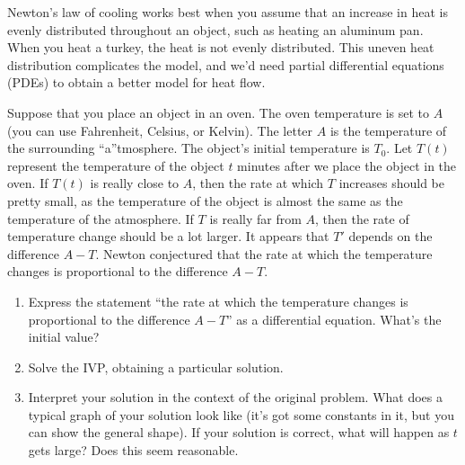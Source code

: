 Newton's law of cooling works best when you assume that an increase in heat is evenly distributed throughout an object, such as heating an aluminum pan. When you heat a turkey, the heat is not evenly distributed. 
This uneven heat distribution complicates the model, and we'd need partial differential equations (PDEs) to obtain a better model for heat flow.  

 
\begin{problem}
 Suppose that you place an object in an oven.  The oven temperature is set to $A$ (you can use Fahrenheit, Celsius, or Kelvin). The letter $A$ is the temperature of the surrounding ``a''tmosphere. The object's initial temperature is $T_0$.  
Let $T(t)$ represent the temperature of the object $t$ minutes after we place the object in the oven. 
If $T(t)$ is really close to $A$, then the rate at which $T$ increases should be pretty small, as the temperature of the object is almost the same as the temperature of the atmosphere.  
If $T$ is really far from $A$, then the rate of temperature change should be a lot larger.  It appears that $T'$ depends on the difference $A-T$.  Newton conjectured that the rate at which the temperature changes is proportional to the difference $A-T$.
\begin{enumerate}
 \item Express the statement ``the rate at which the temperature changes is proportional to the difference $A-T$'' as a differential equation. What's the initial value?
 \item 
{}%
Solve the IVP,  obtaining a particular solution.
 \item Interpret your solution in the context of the original problem. What does a typical graph of your solution look like (it's got some constants in it, but you can show the general shape). If your solution is correct, what will happen as $t$ gets large? Does this seem reasonable.
\end{enumerate}
\end{problem}
 

